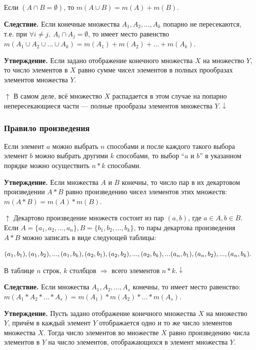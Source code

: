 \documentclass{article}
\begin{document}
        Если \((A \cap B = \emptyset)\), то \(m(A \cup B) = m(A) + m(B)\).

        \textbf{Следствие.} Если конечные множества \(A_1, A_2, ..., A_k\) попарно не пересекаются, т.е. при \(\forall i \not = j,\ A_i \cap A_j = \emptyset\), то имеет место равенство \(m(A_1 \cup A_2 \cup ... \cup A_k) = m(A_1) + m(A_2) + ... + m(A_k)\).

        \textbf{Утверждение.} Если задано отображение конечного множества \(X\) на множество \(Y\), то число элементов в \(X\) равно сумме чисел элементов в полных прообразах элементов множества \(Y\).

        \(\uparrow\) В самом деле, всё множество \(X\) распадается в этом случае на попарно непересекающиеся части --- полные прообразы элементов множества \(Y. \downarrow\)

    \subsubsection{Правило произведения}
        
        Если элемент \(a\) можно выбрать \(n\) способами и после каждого такого выбора элемент \(b\) можно выбрать другими \(k\) способами, то выбор ``\(a\) и \(b\)'' в указанном порядке можно осуществить \(n*k\) способами.

        \textbf{Утверждение.} Если множества \(A\) и \(B\) конечны, то число пар в их декартовом произведении \(A*B\) равно произведению чисел элементов этих множеств: \(m(A*B)=m(A)*m(B)\).

        \(\uparrow\) Декартово произведение множеств состоит из пар \((a, b)\), где \(a \in A, b \in B\). Если \(A = \{a_1, a_2, ..., a_n\}, B = \{b_1, b_2, ..., b_k\}\), то пары декартова произведения \(A*B\) можно записать в виде следующей таблицы:

        \((a_1, b_1), (a_1, b_2), ..., (a_1, b_k),\\
        (a_2, b_1), (a_2, b_2), ..., (a_2, b_k),\\
        ...\\
        (a_n, b_1), (a_n, b_2), ..., (a_n, b_k).\)

        В таблице \(n\) строк, \(k\) столбцов \(\Rightarrow\) всего элементов \(n*k. \downarrow\)

        \textbf{Следствие.} Если множества \(A_1, A_2, ..., A_s\) конечны, то имеет место равенство: \(m(A_1 * A_2 * ... * A_s) = m(A_1)*m(A_2)*...*m(A_s).\)

        \textbf{Утверждение.} Пусть задано отображение конечного множества \(X\) на множество \(Y\), причём в каждый элемент \(Y\) отображается одно и то же число элементов множества \(X\). Тогда число элементов во множестве \(X\) равно произведению числа элементов в \(Y\) на число элементов, отображающихся в элемент множества \(Y\).
\end{document}
